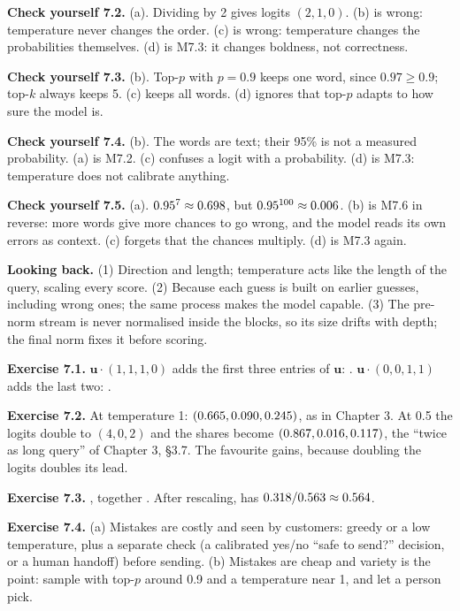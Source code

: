 \textbf{Check yourself 7.2.} (a). Dividing by 2 gives logits $(2,1,0)$. (b) is wrong: temperature never changes the
order. (c) is wrong: temperature changes the probabilities themselves. (d) is M7.3: it changes boldness, not
correctness.

\textbf{Check yourself 7.3.} (b). Top-$p$ with $p=0.9$ keeps one word, since $0.97\ge0.9$; top-$k$ always keeps 5.
(c) keeps all words. (d) ignores that top-$p$ adapts to how sure the model is.

\textbf{Check yourself 7.4.} (b). The words are text; their 95\% is not a measured probability. (a) is M7.2. (c)
confuses a logit with a probability. (d) is M7.3: temperature does not calibrate anything.

\textbf{Check yourself 7.5.} (a). $0.95^7\approx0.698$, but $0.95^{100}\approx0.006$.
(b) is M7.6 in reverse: more words give more chances to go wrong, and the model reads its own errors as context.
(c) forgets that the chances multiply. (d) is M7.3 again.

\textbf{Looking back.} (1) Direction and length; temperature acts like the length of the query, scaling every score.
(2) Because each guess is built on earlier guesses, including wrong ones; the same process makes the model capable.
(3) The pre-norm stream is never normalised inside the blocks, so its size drifts with depth; the final norm fixes
it before scoring.

\textbf{Exercise 7.1.} $\bm{u}\cdot(1,1,1,0)$ adds the first three entries of $\bm{u}$: \nSevenLogitBeen.
$\bm{u}\cdot(0,0,1,1)$ adds the last two: \nSevenLogitTime.

\textbf{Exercise 7.2.} At temperature 1: $(0.665, 0.090, 0.245)$, as in Chapter 3. At 0.5 the logits double to
$(4,0,2)$ and the shares become $(0.867, 0.016, 0.117)$, the ``twice as long query'' of Chapter 3, \S3.7. The
favourite gains, because doubling the logits doubles its lead.

\textbf{Exercise 7.3.} \nSevenToppHalfWords, together \nSevenToppHalfMass. After rescaling,  has
$0.318/0.563\approx0.564$.

\textbf{Exercise 7.4.} (a) Mistakes are costly and seen by customers: greedy or a low temperature, plus a separate
check (a calibrated yes/no ``safe to send?'' decision, or a human handoff) before sending. (b) Mistakes are cheap and
variety is the point: sample with top-$p$ around 0.9 and a temperature near 1, and let a person pick.
\normalsize

